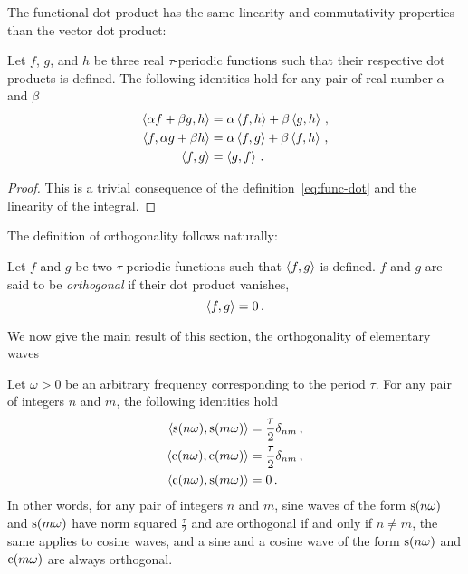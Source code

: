 The functional dot product has the same linearity and commutativity properties than the
vector dot product:
\begin{proposition}
  Let $f$, $g$, and $h$ be three real $\tau$-periodic functions such that their respective
  dot products is defined. The following identities hold for any pair of real number
  $\alpha$ and $\beta$
  \begin{align}
    \braket{\alpha f+\beta g,h}&=\alpha\braket{f,h}+\beta\braket{g,h}\,,\\
    \braket{f,\alpha g+\beta h}&=\alpha\braket{f,g}+\beta\braket{f,h}\,,\\
    \braket{f,g}&=\braket{g,f}\,.
  \end{align}
\end{proposition}
\begin{proof}
  This is a trivial consequence of the definition~\cref{eq:func-dot} and the linearity of
  the integral.
\end{proof}
The definition of orthogonality follows naturally:
\begin{definition}
  \label{def:dot-rfunc}
  Let $f$ and $g$ be two $\tau$-periodic functions such that $\braket{f,g}$ is defined.
  $f$ and $g$ are said to be \emph{orthogonal} if their dot product vanishes, \ie
  \begin{equation}
    \braket{f,g}=0\,.
  \end{equation}
\end{definition}
We now give the main result of this section, \ie the orthogonality of elementary waves
\begin{theorem}
  \label{thm:sc-orth}
  Let $\omega>0$ be an arbitrary frequency corresponding to the period $\tau$. For any
  pair of integers $n$ and $m$, the following identities hold
  \begin{align}
    \braket{\operatorname{s}(n\omega),\operatorname{s}(m\omega)}&=\frac{\tau}{2}\delta_{nm}\,,\label{eq:sw-orth}\\
    \braket{\operatorname{c}(n\omega),\operatorname{c}(m\omega)}&=\frac{\tau}{2}\delta_{nm}\,,\label{eq:cw-orth}\\
    \braket{\operatorname{c}(n\omega),\operatorname{s}(m\omega)}&=0\,.\label{eq:scw-orth}
  \end{align}
  In other words, for any pair of integers $n$ and $m$, sine waves of the form
  $\operatorname{s}(n\omega)$ and $\operatorname{s}(m\omega)$ have norm squared $\frac{\tau}{2}$ and are orthogonal
  if and only if $n\neq m$, the same applies to cosine waves, and a sine and a cosine wave
  of the form $\operatorname{s}(n\omega)$ and $\operatorname{c}(m\omega)$ are always orthogonal.
\end{theorem}
